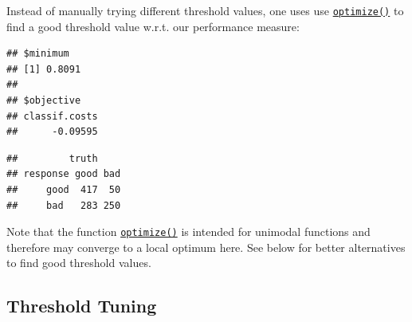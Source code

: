 \documentclass[
]{scrbook}
\newenvironment{Shaded}{\begin{snugshade}}{\end{snugshade}}
\newcommand{\CommentTok}[1]{\textcolor[rgb]{0.56,0.35,0.01}{\textit{#1}}}
\newcommand{\ControlFlowTok}[1]{\textcolor[rgb]{0.13,0.29,0.53}{\textbf{#1}}}
\newcommand{\DecValTok}[1]{\textcolor[rgb]{0.00,0.00,0.81}{#1}}
\newcommand{\FloatTok}[1]{\textcolor[rgb]{0.00,0.00,0.81}{#1}}
\newcommand{\FunctionTok}[1]{\textcolor[rgb]{0.00,0.00,0.00}{#1}}
\newcommand{\NormalTok}[1]{#1}
\newcommand{\OtherTok}[1]{\textcolor[rgb]{0.56,0.35,0.01}{#1}}
\newcommand{\SpecialCharTok}[1]{\textcolor[rgb]{0.00,0.00,0.00}{#1}}
\renewenvironment{Shaded} {\begin{snugshade}\small} {\end{snugshade}}
\begin{document}
Instead of manually trying different threshold values, one uses use \href{https://www.rdocumentation.org/packages/stats/topics/optimize}{\texttt{optimize()}} to find a good threshold value w.r.t. our performance measure:

\begin{Shaded}
\end{Shaded}

\begin{verbatim}
## $minimum
## [1] 0.8091
## 
## $objective
## classif.costs 
##      -0.09595
\end{verbatim}

\begin{Shaded}
\end{Shaded}

\begin{verbatim}
##         truth
## response good bad
##     good  417  50
##     bad   283 250
\end{verbatim}

Note that the function \href{https://www.rdocumentation.org/packages/stats/topics/optimize}{\texttt{optimize()}} is intended for unimodal functions and therefore may converge to a local optimum here.
See below for better alternatives to find good threshold values.

\hypertarget{threshold-tuning-1}{%
\subsection{Threshold Tuning}\label{threshold-tuning-1}}
\end{document}
